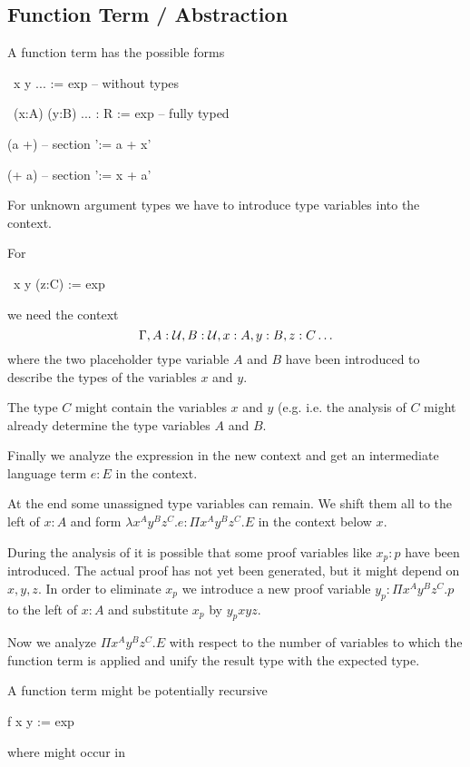 \subsection{Function Term / Abstraction}

A function term has the possible forms

\begin{alba}
  \ x y ... := exp                     -- without types

  \ (x:A) (y:B) ... : R := exp         -- fully typed

  (a +)                                -- section '\x := a + x'

  (+ a)                                -- section '\x := x + a'
\end{alba}


For unknown argument types we have to introduce type variables into the context.

For
\begin{alba}
  \ x y (z:C) := exp
\end{alba}
%
we need the context
$$
    \Gamma, A:{\cal{U}}, B:{\cal{U}}, x:A, y:B, z:C \ldots
$$
%
where the two placeholder type variable $A$ and $B$ have been introduced to
describe the types of the variables $x$ and $y$.

The type $C$ might contain the variables $x$ and $y$ (e.g. 
i.e. the analysis of $C$ might already determine the type variables $A$ and
$B$.

Finally we analyze the expression  in the new context and get an
intermediate language term $e:E$ in the context.

At the end some unassigned type variables can remain. We shift them all to the
left of $x:A$ and form $\lambda x^A y^B z^C . e : \Pi x^A y^B z^C . E$ in the
context below $x$.

During the analysis of  it is possible that some proof variables
like $x_p:p$ have been introduced. The actual proof has not yet been
generated, but it might depend on $x,y,z$. In order to eliminate $x_p$ we
introduce a new proof variable $y_p:\Pi x^A y^B z^C . p$ to the left of $x:A$
and substitute $x_p$ by $y_p x y z$.

Now we analyze $\Pi x^A y^B z^C . E$ with respect to the number of variables
to which the function term is applied and unify the result type with the
expected type.



A function term might be potentially recursive
\begin{alba}
  f x y := exp
\end{alba}
where  might occur in 

